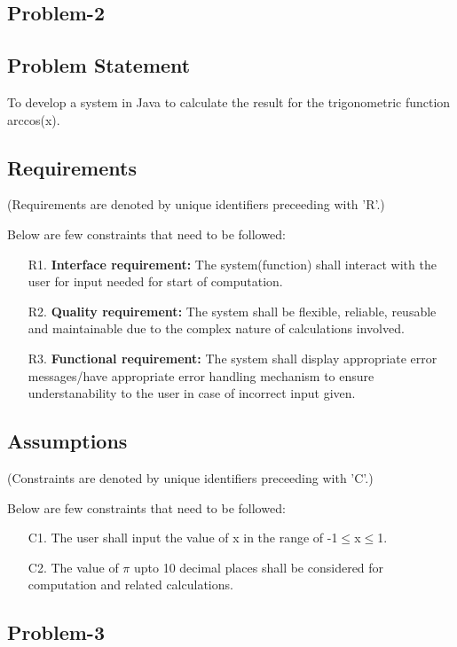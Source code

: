 \documentclass[12pt]{report}
\begin{document}
	\pagebreak
	\begin{center}
		\section{Problem-2} 		
	\end{center}
		\subsection{Problem Statement}

		To develop a system in Java to calculate the result for the trigonometric function arccos(x).
		
	\begin{flushleft}
		\subsection{Requirements}
		\small (Requirements are denoted by unique identifiers preceeding with 'R'.)
	\end{flushleft}
	Below are few constraints that need to be followed:
	\begin{itemize}
		\item[R1.] \textbf{Interface requirement:} The system(function) shall interact with the user for input needed for start of computation.
		\item[R2.] \textbf{Quality requirement:} The system shall be flexible, reliable, reusable and maintainable due to the complex nature of calculations involved.
		\item[R3.] \textbf{Functional requirement:} The system shall display appropriate error messages/have appropriate error handling mechanism to ensure understanability to the user in case of incorrect input given.
	\end{itemize}
		
	\begin{flushleft}
		\subsection{Assumptions}
		\small (Constraints are denoted by unique identifiers preceeding with 'C'.)
	\end{flushleft}
		Below are few constraints that need to be followed:
		\begin{itemize} 
			\item[C1.] The user shall input the value of x in the range of -1$\leq$x$\leq$1.
			\item[C2.] The value of $\pi$ upto 10 decimal places shall be considered for computation and related calculations.
		\end{itemize}
\pagebreak
	\begin{center}
		\section{Problem-3} 		
	\end{center}
\end{document}
